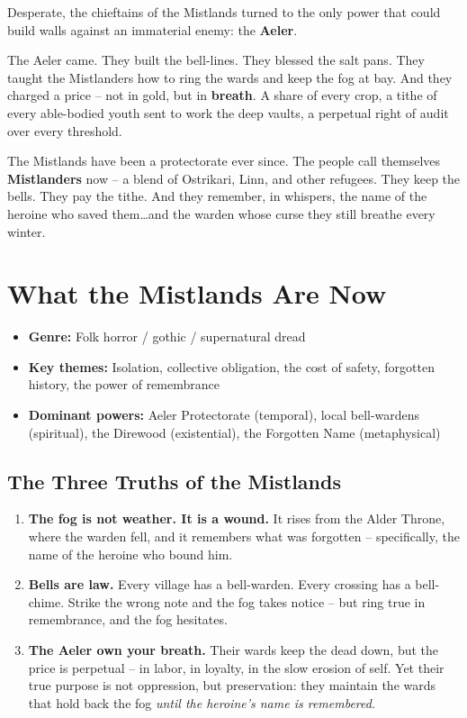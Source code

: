 \documentclass[12pt]{article}
\begin{document}
Desperate, the chieftains of the Mistlands turned to the only power that could build walls against an immaterial enemy: the \textbf{Aeler}.

The Aeler came. They built the bell-lines. They blessed the salt pans. They taught the Mistlanders how to ring the wards and keep the fog at bay. And they charged a price -- not in gold, but in \textbf{breath}. A share of every crop, a tithe of every able-bodied youth sent to work the deep vaults, a perpetual right of audit over every threshold.

The Mistlands have been a protectorate ever since. The people call themselves \textbf{Mistlanders} now -- a blend of Ostrikari, Linn, and other refugees. They keep the bells. They pay the tithe. And they remember, in whispers, the name of the heroine who saved them\dots and the warden whose curse they still breathe every winter.


\section{What the Mistlands Are Now}
\begin{itemize}[leftmargin=*]
  \item \textbf{Genre:} Folk horror / gothic / supernatural dread
  \item \textbf{Key themes:} Isolation, collective obligation, the cost of safety, forgotten history, the power of remembrance
  \item \textbf{Dominant powers:} Aeler Protectorate (temporal), local bell-wardens (spiritual), the Direwood (existential), the Forgotten Name (metaphysical)
\end{itemize}

\subsection{The Three Truths of the Mistlands}
\begin{enumerate}[label=\arabic*.]
  \item \textbf{The fog is not weather. It is a wound.} It rises from the Alder Throne, where the warden fell, and it remembers what was forgotten -- specifically, the name of the heroine who bound him.
  \item \textbf{Bells are law.} Every village has a bell-warden. Every crossing has a bell-chime. Strike the wrong note and the fog takes notice -- but ring true in remembrance, and the fog hesitates.
  \item \textbf{The Aeler own your breath.} Their wards keep the dead down, but the price is perpetual -- in labor, in loyalty, in the slow erosion of self. Yet their true purpose is not oppression, but preservation: they maintain the wards that hold back the fog \textit{until the heroine's name is remembered}.
\end{enumerate}
\end{document}
